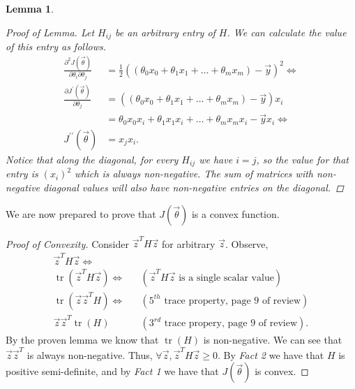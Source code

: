 \documentclass[12pt]{article}
\newtheorem*{lemma}{Lemma}
\DeclareMathOperator{\Tr}{tr}
\begin{document}
\begin{enumerate}
\begin{lemma}
\begin{proof}[Proof of Lemma]
  	Let $H_{ij}$ be an arbitrary entry of $H$. We can calculate the value of this entry as follows.
    \begin{align*}
    \frac{\partial^2J(\vec{\theta})}{\partial\theta_i\partial\theta_j} &= \frac{1}{2}\left( (\theta_0x_0 + \theta_1x_1 + \dots + \theta_mx_m) - \vec{y} \right)^2 \Longleftrightarrow \\
    \frac{\partial J^\prime(\vec{\theta})}{\partial\theta_j} &= \left( (\theta_0x_0 + \theta_1x_1 + \dots + \theta_mx_m) - \vec{y} \right)x_i \\ 
    &= \theta_0x_0x_i + \theta_1x_1x_i + \dots + \theta_mx_mx_i - \vec{y}x_i  \Longleftrightarrow \\
    J^{\prime\prime}(\vec{\theta}) &= x_jx_i .
    \end{align*}
    Notice that along the diagonal, for every $H_{ij}$ we have $i = j$, so the value for that entry is $(x_i)^2$ which is always non-negative. The sum of matrices with non-negative diagonal values will also have non-negative entries on the diagonal.
    \end{proof}
  
  \end{lemma}
  
  We are now prepared to prove that $J(\vec{\theta})$ is a convex function.
  
  \begin{proof}[Proof of Convexity]
   Consider $\vec{z}^T H \vec{z}$ for arbitrary $\vec{z}$. Observe,
   \begin{align*}
   \vec{z}^T H \vec{z} \Leftrightarrow& & \\
   \Tr(\vec{z}^T H \vec{z}) \Leftrightarrow& & \left(\vec{z}^T H \vec{z} \text{ is a single scalar value} \right) \\
   \Tr(\vec{z}\vec{z}^T H) \Leftrightarrow& & \left( 5^{th} \text{ trace property, page 9 of review} \right) \\
   \vec{z}\vec{z}^T \Tr(H) & & \left( 3^{rd} \text{ trace propery, page 9 of review} \right).
   \end{align*}
   By the proven lemma we know that $\Tr(H)$ is non-negative. We can see that $\vec{z}\vec{z}^T$ is always non-negative. Thus, $\forall \vec{z}, \vec{z}^T H \vec{z} \geq 0$. By \textit{Fact 2} we have that $H$ is positive semi-definite, and by \textit{Fact 1} we have that $J(\vec{\theta})$ is convex. 
  \end{proof}
  
  
  

\end{enumerate}
\end{document}
